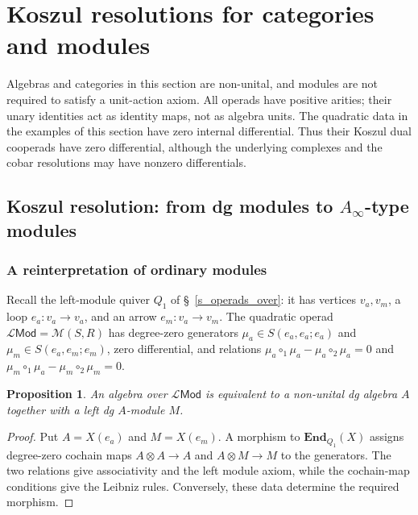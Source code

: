 \documentclass[11pt,letterpaper]{article}
\numberwithin{equation}{section}
\theoremstyle{plain}
\newtheorem{prop}[thm]{Proposition}
\theoremstyle{definition}
\theoremstyle{remark}
\begin{document}
\section{Koszul resolutions for categories and modules}
	\label{s_examples_applications}
Algebras and categories in this section are non-unital, and modules
are not required to satisfy a unit-action axiom. All operads have positive
arities; their unary identities act as identity maps, not as algebra units.
The quadratic data in the examples of this section have zero internal
differential. Thus their Koszul dual cooperads have zero differential,
although the underlying complexes and the cobar resolutions may have
nonzero differentials.

	\subsection{Koszul resolution: from dg modules to \texorpdfstring{$A_\infty$}{A-infinity}-type modules}
	\label{ss_example_left_module}

\subsubsection{A reinterpretation of ordinary modules}
Recall the left-module quiver $Q_1$ of \S~\ref{s_operads_over}: it has vertices
$v_a,v_m$, a loop $e_a:v_a\to v_a$, and an arrow $e_m:v_a\to v_m$.
The quadratic operad $\mathscr L\mathsf{Mod}=\mathscr M(S,R)$ has
degree-zero generators $\mu_a\in S(e_a,e_a;e_a)$ and
$\mu_m\in S(e_a,e_m;e_m)$, zero differential, and relations
$\mu_a\circ_1\mu_a-\mu_a\circ_2\mu_a=0$ and
$\mu_m\circ_1\mu_a-\mu_m\circ_2\mu_m=0$.

\begin{prop}
\label{prop_LMod}
An algebra over $\mathscr L\mathsf{Mod}$ is equivalent to a non-unital
dg algebra $A$ together with a left dg $A$-module $M$.
\end{prop}
\begin{proof}
Put $A=X(e_a)$ and $M=X(e_m)$. A morphism to
$\mathbf{End}_{Q_1}(X)$ assigns degree-zero cochain maps
$A\otimes A\to A$ and $A\otimes M\to M$ to the generators.
The two relations give associativity and the left module axiom, while
the cochain-map conditions give the Leibniz rules. Conversely, these
data determine the required morphism.
\end{proof}
\end{document}
